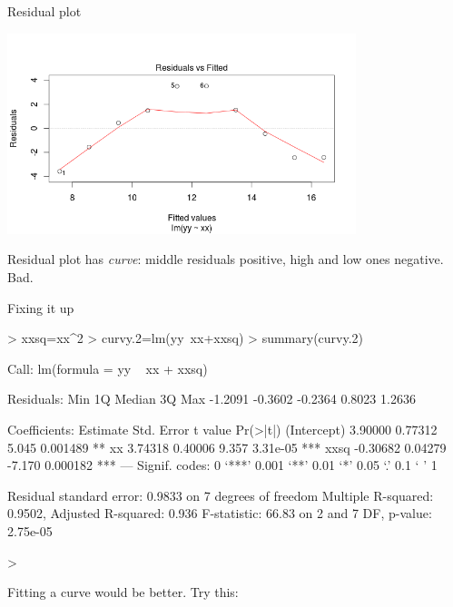 \documentclass{beamer}
\begin{document}
\begin{frame}[fragile]{Residual plot}

\includegraphics[width=4in]{curvy-residual}

Residual plot has {\em curve}: middle residuals positive, high and low ones negative. Bad.
  
\end{frame}

\begin{frame}[fragile]{Fixing it up}


\vspace{3ex}

\begin{Schunk}
\begin{Sinput}
> xxsq=xx^2
> curvy.2=lm(yy~xx+xxsq)
> summary(curvy.2)
\end{Sinput}
\begin{Soutput}
Call:
lm(formula = yy ~ xx + xxsq)

Residuals:
    Min      1Q  Median      3Q     Max 
-1.2091 -0.3602 -0.2364  0.8023  1.2636 

Coefficients:
            Estimate Std. Error t value Pr(>|t|)    
(Intercept)  3.90000    0.77312   5.045 0.001489 ** 
xx           3.74318    0.40006   9.357 3.31e-05 ***
xxsq        -0.30682    0.04279  -7.170 0.000182 ***
---
Signif. codes:  0 ‘***’ 0.001 ‘**’ 0.01 ‘*’ 0.05 ‘.’ 0.1 ‘ ’ 1

Residual standard error: 0.9833 on 7 degrees of freedom
Multiple R-squared:  0.9502,	Adjusted R-squared:  0.936 
F-statistic: 66.83 on 2 and 7 DF,  p-value: 2.75e-05
\end{Soutput}
\begin{Sinput}
> 
\end{Sinput}
\end{Schunk}


Fitting a curve would be better. Try this:


\end{frame}
\end{document}
